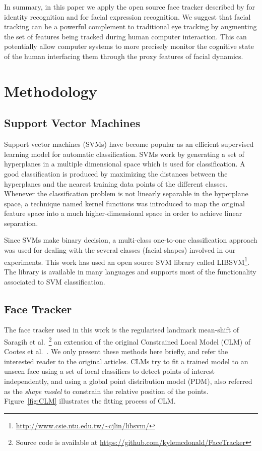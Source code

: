 \documentclass[]{article}
\begin{document}
In summary, in this paper we apply the open source face tracker described by \cite{saragih2011deformable} for identity
recognition and for facial expression recognition. We suggest that facial tracking can be a powerful complement to
traditional eye tracking  by augmenting the set of features being tracked during human computer interaction. This  can
potentially allow computer systems to more precisely monitor the cognitive state of the human interfacing them through
the proxy features of facial dynamics.


\section{Methodology}

\subsection{Support Vector Machines}
Support vector machines (SVMs) have become popular as an efficient supervised learning model for automatic
classification. SVMs work by generating a set of hyperplanes in a multiple dimensional space which is used for
classification.  A good classification is produced by maximizing the distances between the hyperplanes and the nearest
training data points of the different classes. Whenever the classification problem is not linearly separable in the
hyperplane space, a technique named kernel functions was introduced to map the original feature space into a much
higher-dimensional space in order to achieve linear separation.

Since SVMs make binary decision, a multi-class one-to-one classification approach was used for dealing with the
several classes (facial shapes) involved in our experiments. This work has used an open source SVM library called
LIBSVM\footnote{\url{http://www.csie.ntu.edu.tw/~cjlin/libsvm/}}. The library is available in many languages and
supports most of the functionality associated to SVM classification.


\subsection{Face Tracker}
The face tracker used in this work is the regularised landmark mean-shift of Saragih et
al.~\cite{saragih2011deformable}\footnote{Source code is available at
  \url{https://github.com/kylemcdonald/FaceTracker}} an extension of
the original Constrained Local Model (CLM) of Cootes et al.~\cite{cristinacce2006feature}. We only present these methods
here briefly, and refer the interested reader to the original articles. CLMs try to fit a trained model to an unseen
face using a set of local classifiers to detect points of interest independently, and using a global point distribution model (PDM),
also referred as the \textit{shape model} to constrain the relative position of the points. Figure~\ref{fig:CLM}
illustrates the fitting process of CLM.
\end{document}
